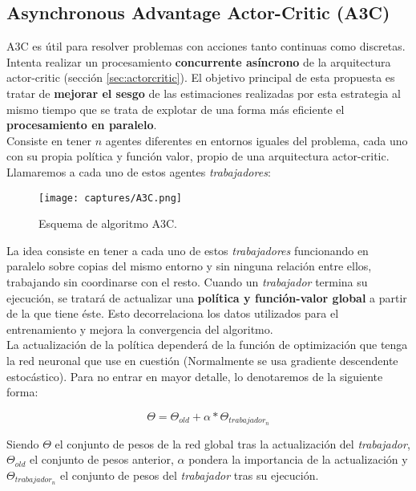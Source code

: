 \documentclass[11pt,fleqn]{book} %
\begin{document}
\subsection{Asynchronous Advantage Actor-Critic (A3C)}

A3C \cite{article:A2C} \cite{article:A3C} es útil para resolver problemas con acciones tanto continuas como discretas. Intenta realizar un procesamiento \textbf{concurrente asíncrono} de la arquitectura actor-critic (sección \ref{sec:actorcritic}). El objetivo principal de esta propuesta es tratar de \textbf{mejorar el sesgo} de las estimaciones realizadas por esta estrategia al mismo tiempo que se trata de explotar de una forma más eficiente el \textbf{procesamiento en paralelo}. \\

Consiste en tener $n$ agentes diferentes en entornos iguales del problema, cada uno con su propia política y función valor, propio de una arquitectura actor-critic. Llamaremos a cada uno de estos agentes \textit{trabajadores}:

\begin{figure}[H]
	\centering\texttt{[image: captures/A3C.png]}
	\caption{Esquema de algoritmo A3C.}
	\label{fig:A3C} %
\end{figure}

La idea consiste en tener a cada uno de estos \textit{trabajadores} funcionando en paralelo sobre copias del mismo entorno y sin ninguna relación entre ellos, trabajando sin coordinarse con el resto. Cuando un \textit{trabajador} termina su ejecución, se tratará de actualizar una \textbf{política y función-valor global} a partir de la que tiene éste. Esto decorrelaciona los datos utilizados para el entrenamiento y mejora la convergencia del algoritmo. \\

La actualización de la política dependerá de la función de optimización que tenga la red neuronal que use en cuestión (Normalmente se usa gradiente descendente estocástico). Para no entrar en mayor detalle, lo denotaremos de la siguiente forma:

\begin{equation}
\Theta = \Theta_{old}+\alpha*\Theta_{trabajador_n}
\end{equation}

Siendo $\Theta$ el conjunto de pesos de la red global tras la actualización del \textit{trabajador}, $\Theta_{old}$ el conjunto de pesos anterior, $\alpha$ pondera la importancia de la actualización y $\Theta_{trabajador_n}$ el conjunto de pesos del \textit{trabajador} tras su ejecución. \\
\end{document}
